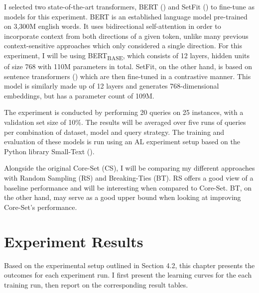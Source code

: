 \documentclass[english,bachelor,ul]{webisthesis} %
\begin{document}
I selected two state-of-the-art transformers, BERT (\cite{DBLP:conf/naacl/DevlinCLT19}) and SetFit (\cite{DBLP:setfit}) to fine-tune as models for this experiment. BERT is an established language model pre-trained on 3,300M english words. It uses bidirectional self-attention in order to incorporate context from both directions of a given token, unlike many previous context-sensitive approaches which only considered a single direction. For this experiment, I will be using BERT\textsubscript{BASE}, which consists of 12 layers, hidden units of size 768 with 110M parameters in total. SetFit, on the other hand, is based on sentence transformers (\cite{DBLP:conf/emnlp/ReimersG19}) which are then fine-tuned in a contrastive manner. This model is similarly made up of 12 layers and generates 768-dimensional embeddings, but has a parameter count of 109M.  

The experiment is conducted by performing 20 queries on 25 instances, with a validation set size of 10\%. The results will be averaged over five runs of queries per combination of dataset, model and query strategy. The training and evaluation of these models is run using an AL experiment setup based on the Python library Small-Text (\cite{schroeder2023small-text}).

Alongside the original Core-Set (CS), I will be comparing my different approaches with Random Sampling (RS) and Breaking-Ties (BT). RS offers a good view of a baseline performance and will be interesting when compared to Core-Set. BT, on the other hand, may serve as a good upper bound when looking at improving Core-Set's performance.

\section{Experiment Results}

Based on the experimental setup outlined in Section 4.2, this chapter presents the outcomes for each experiment run. I first present the learning curves for the each training run, then report on the corresponding result tables.
\end{document}
